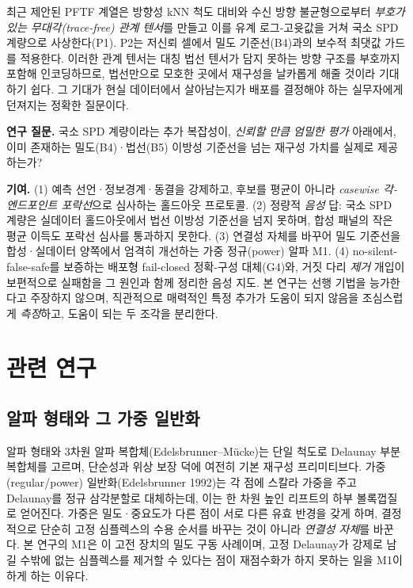 \documentclass[11pt]{article}
\begin{document}
최근 제안된 PFTF 계열은 방향성 kNN 척도 대비와 수신 방향 불균형으로부터 \emph{부호가
있는 무대각(trace-free) 관계 텐서}를 만들고 이를 유계 로그-고윳값을 거쳐 국소 SPD 계량으로
사상한다(P1). P2는 저신뢰 셀에서 밀도 기준선(B4)과의 보수적 최댓값 가드를 적용한다.
이러한 관계 텐서는 대칭 법선 텐서가 담지 못하는 방향 구조를 부호까지 포함해 인코딩하므로,
법선만으로 모호한 곳에서 재구성을 날카롭게 해줄 것이라 기대하기 쉽다. 그 기대가 현실
데이터에서 살아남는지가 배포를 결정해야 하는 실무자에게 던져지는 정확한 질문이다.

\textbf{연구 질문.} 국소 SPD 계량이라는 추가 복잡성이, \emph{신뢰할 만큼 엄밀한 평가} 아래에서,
이미 존재하는 밀도(B4)·법선(B5) 이방성 기준선을 넘는 재구성 가치를 실제로 제공하는가?

\textbf{기여.} (1) 예측 선언·정보경계·동결을 강제하고, 후보를 평균이 아니라 \emph{casewise
각-엔드포인트 포락선}으로 심사하는 홀드아웃 프로토콜. (2) 정량적 \emph{음성} 답: 국소 SPD
계량은 실데이터 홀드아웃에서 법선 이방성 기준선을 넘지 못하며, 합성 패널의 작은 평균 이득도
포락선 심사를 통과하지 못한다. (3) 연결성 자체를 바꾸어 밀도 기준선을 합성·실데이터 양쪽에서
엄격히 개선하는 가중 정규(power) 알파 M1. (4) no-silent-false-safe를 보증하는 배포형
fail-closed 정확-구성 대체(G4)와, 거짓 다리 \emph{제거} 개입이 보편적으로 실패함을 그 원인과
함께 정리한 음성 지도. 본 연구는 선행 기법을 능가한다고 주장하지 않으며, 직관적으로 매력적인
특정 추가가 도움이 되지 않음을 조심스럽게 \emph{측정}하고, 도움이 되는 두 조각을 분리한다.

\section{관련 연구}
\subsection{알파 형태와 그 가중 일반화}
알파 형태와 3차원 알파 복합체(Edelsbrunner--Mücke)는 단일 척도로 Delaunay 부분복합체를
고르며, 단순성과 위상 보장 덕에 여전히 기본 재구성 프리미티브다. 가중(regular/power)
일반화(Edelsbrunner 1992)는 각 점에 스칼라 가중을 주고 Delaunay를 정규 삼각분할로 대체하는데,
이는 한 차원 높인 리프트의 하부 볼록껍질로 얻어진다. 가중은 밀도·중요도가 다른 점이 서로
다른 유효 반경을 갖게 하며, 결정적으로 단순히 고정 심플렉스의 수용 순서를 바꾸는 것이 아니라
\emph{연결성 자체}를 바꾼다. 본 연구의 M1은 이 고전 장치의 밀도 구동 사례이며, 고정 Delaunay가
강제로 남길 수밖에 없는 심플렉스를 제거할 수 있다는 점이 재점수화가 하지 못하는 일을 M1이 하게
하는 이유다.
\end{document}
